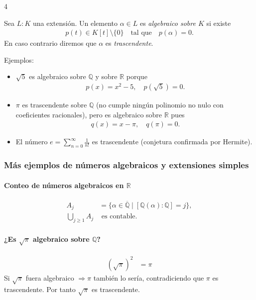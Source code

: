 \documentclass[landscape,a4paper]{article}
\begin{document}
\begin{multicols}{4}
\begin{tcolorbox}[colback=white,colframe=blue!80!black,colbacktitle=blue!80!black,
                  coltitle=white,title={Definición (Elementos algebraicos y trascendentes)}]
Sea $L:K$ una extensión. Un elemento \(\alpha\in L\) es \emph{algebraico sobre \(K\)} si existe
\begin{align*}
  p(t)\in K[t]\setminus\{0\}\quad\text{tal que}\quad p(\alpha)=0.
\end{align*}
En caso contrario diremos que \(\alpha\) es \emph{trascendente}.
\end{tcolorbox}
Ejemplos:
\begin{itemize}
  \item \(\sqrt{5}\) es algebraico sobre \(\mathbb{Q}\) y sobre \(\mathbb{R}\) porque
        \begin{align*}
          p(x)=x^{2}-5,\quad p(\sqrt{5})=0.
        \end{align*}
  \item \(\pi\) es trascendente sobre \(\mathbb{Q}\) (no cumple ningún polinomio no nulo con coeficientes racionales), pero es algebraico sobre \(\mathbb{R}\) pues
        \begin{align*}
          q(x)=x-\pi,\quad q(\pi)=0.
        \end{align*}
  \item El número \(e=\displaystyle\sum_{n=0}^{\infty}\frac1{n!}\) es trascendente (conjetura confirmada por Hermite). 
\end{itemize}
\subsubsection*{Más ejemplos de números algebraicos y extensiones simples}

\paragraph{Conteo de números algebraicos en $\mathbb{R}$}
\begin{align*}
A_j &= \{\alpha\in\overline{\mathbb{Q}}\mid [\mathbb{Q}(\alpha):\mathbb{Q}] = j\},\\
\bigcup_{j\ge 1} A_j &\text{ es contable.}
\end{align*}

\paragraph{¿Es $\sqrt{\pi}$ algebraico sobre $\mathbb{Q}$?}
\begin{align*}
(\sqrt{\pi})^{2} &= \pi
\end{align*}
Si $\sqrt{\pi}$ fuera algebraico $\Rightarrow \pi$ también lo sería, contradiciendo que $\pi$ es trascendente. Por tanto $\sqrt{\pi}$ es trascendente.


\end{multicols}
\end{document}
